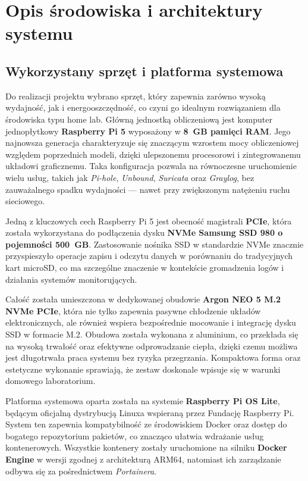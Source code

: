\documentclass[
    left=2.5cm,         %
    right=2.5cm,        %
    top=2.5cm,          %
    bottom=3cm,         %
    bindingoffset=6mm,  %
    nohyphenation=true %
]{eiti/eiti-thesis} %
\begin{document}
\section{Opis środowiska i architektury systemu}
\subsection{Wykorzystany sprzęt i platforma systemowa}

Do realizacji projektu wybrano sprzęt, który zapewnia zarówno wysoką wydajność, jak i energooszczędność, co czyni go idealnym rozwiązaniem dla środowiska typu home lab. Główną jednostką obliczeniową jest komputer jednopłytkowy \textbf{Raspberry Pi 5} wyposażony w \textbf{8~GB pamięci RAM}. Jego najnowsza generacja charakteryzuje się znaczącym wzrostem mocy obliczeniowej względem poprzednich modeli, dzięki ulepszonemu procesorowi i zintegrowanemu układowi graficznemu. Taka konfiguracja pozwala na równoczesne uruchomienie wielu usług, takich jak \textit{Pi-hole}, \textit{Unbound}, \textit{Suricata} oraz \textit{Graylog}, bez zauważalnego spadku wydajności — nawet przy zwiększonym natężeniu ruchu sieciowego.

Jedną z kluczowych cech Raspberry Pi 5 jest obecność magistrali \textbf{PCIe}, która została wykorzystana do podłączenia dysku \textbf{NVMe Samsung SSD 980 o pojemności 500~GB}. Zastosowanie nośnika SSD w standardzie NVMe znacznie przyspieszyło operacje zapisu i odczytu danych w porównaniu do tradycyjnych kart microSD, co ma szczególne znaczenie w kontekście gromadzenia logów i działania systemów monitorujących.

Całość została umieszczona w dedykowanej obudowie \textbf{Argon NEO 5 M.2 NVMe PCIe}, która nie tylko zapewnia pasywne chłodzenie układów elektronicznych, ale również wspiera bezpośrednie mocowanie i integrację dysku SSD w formacie M.2. Obudowa została wykonana z aluminium, co przekłada się na wysoką trwałość oraz efektywne odprowadzanie ciepła, dzięki czemu możliwa jest długotrwała praca systemu bez ryzyka przegrzania. Kompaktowa forma oraz estetyczne wykonanie sprawiają, że zestaw doskonale wpisuje się w warunki domowego laboratorium.

Platforma systemowa oparta została na systemie \textbf{Raspberry Pi OS Lite}, będącym oficjalną dystrybucją Linuxa wspieraną przez Fundację Raspberry Pi. System ten zapewnia kompatybilność ze środowiskiem Docker oraz dostęp do bogatego repozytorium pakietów, co znacząco ułatwia wdrażanie usług kontenerowych. Wszystkie kontenery zostały uruchomione na silniku \textbf{Docker Engine} w wersji zgodnej z architekturą ARM64, natomiast ich zarządzanie odbywa się za pośrednictwem \textit{Portainera}.
\end{document}
